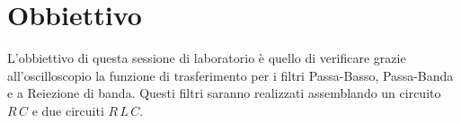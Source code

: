 \section*{Obbiettivo}

L'obbiettivo di questa sessione di laboratorio è quello di verificare grazie all'oscilloscopio la funzione di trasferimento per i filtri Passa-Basso, Passa-Banda e a Reiezione di banda.
Questi filtri saranno realizzati assemblando un circuito $R\,C$ e due circuiti $R\,L\,C$.